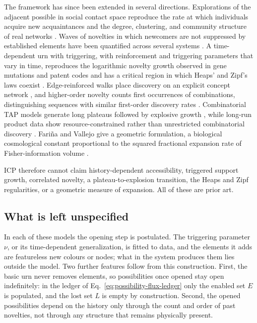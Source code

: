 The framework has since been extended in several directions. Explorations of
the adjacent possible in social contact space reproduce the rate at which
individuals acquire new acquaintances and the degree, clustering, and community
structure of real networks \citep{UbaldiEtAl2021SocialNetworks}. Waves of
novelties in which newcomers are not suppressed by established elements have
been quantified across several systems \citep{MonechiEtAl2017Waves}. A
time-dependent urn with triggering, with reinforcement and triggering
parameters that vary in time, reproduces the logarithmic novelty growth
observed in gene mutations and patent codes and has a critical region in which
Heaps' and Zipf's laws coexist \citep{BellinaEtAl2025TimeDependentUrn}.
Edge-reinforced walks place discovery on an explicit concept network
\citep{IacopiniEtAl2018Innovation}, and higher-order novelty counts first
occurrences of combinations, distinguishing sequences with similar first-order
discovery rates \citep{DiBonaEtAl2025HigherOrder}. Combinatorial TAP models
generate long plateaus followed by explosive growth
\citep{SteelEtAl2020Combinatorial}, while long-run product data show
resource-constrained rather than unrestricted combinatorial discovery
\citep{Taalbi2026AdjacentPossible}. Fari\~na and Vallejo give a geometric
formulation, a biological cosmological constant proportional to the squared
fractional expansion rate of Fisher-information volume
\citep{FarinaVallejo2026LambdaB}.

ICP therefore cannot claim history-dependent accessibility, triggered support
growth, correlated novelty, a plateau-to-explosion transition, the Heaps and
Zipf regularities, or a geometric measure of expansion. All of these are prior
art.

\subsection{What is left unspecified}

In each of these models the opening step is postulated. The triggering
parameter $\nu$, or its time-dependent generalization, is fitted to data, and
the elements it adds are featureless new colours or nodes; what in the system
produces them lies outside the model. Two further features follow from this
construction. First, the basic urn never removes elements, so possibilities
once opened stay open indefinitely: in the ledger of
Eq.~\eqref{eq:possibility-flux-ledger} only the enabled set $E$ is populated,
and the lost set $L$ is empty by construction. Second, the opened
possibilities depend on the history only through the count and order of past
novelties, not through any structure that remains physically present.

